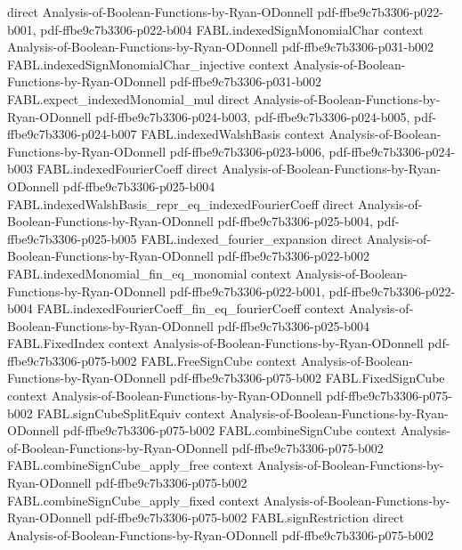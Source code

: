 \begin{theorem}
  {direct}
  {Analysis-of-Boolean-Functions-by-Ryan-ODonnell}
  {pdf-ffbe9c7b3306-p022-b001,
    pdf-ffbe9c7b3306-p022-b004}
\proofstep
  {FABL.indexedSignMonomialChar}
  {context}
  {Analysis-of-Boolean-Functions-by-Ryan-ODonnell}
  {pdf-ffbe9c7b3306-p031-b002}
\proofstep
  {FABL.indexedSignMonomialChar_injective}
  {context}
  {Analysis-of-Boolean-Functions-by-Ryan-ODonnell}
  {pdf-ffbe9c7b3306-p031-b002}
\proofstep
  {FABL.expect_indexedMonomial_mul}
  {direct}
  {Analysis-of-Boolean-Functions-by-Ryan-ODonnell}
  {pdf-ffbe9c7b3306-p024-b003,
    pdf-ffbe9c7b3306-p024-b005,
    pdf-ffbe9c7b3306-p024-b007}
\proofstep
  {FABL.indexedWalshBasis}
  {context}
  {Analysis-of-Boolean-Functions-by-Ryan-ODonnell}
  {pdf-ffbe9c7b3306-p023-b006,
    pdf-ffbe9c7b3306-p024-b003}
\proofstep
  {FABL.indexedFourierCoeff}
  {direct}
  {Analysis-of-Boolean-Functions-by-Ryan-ODonnell}
  {pdf-ffbe9c7b3306-p025-b004}
\proofstep
  {FABL.indexedWalshBasis_repr_eq_indexedFourierCoeff}
  {direct}
  {Analysis-of-Boolean-Functions-by-Ryan-ODonnell}
  {pdf-ffbe9c7b3306-p025-b004,
    pdf-ffbe9c7b3306-p025-b005}
\proofstep
  {FABL.indexed_fourier_expansion}
  {direct}
  {Analysis-of-Boolean-Functions-by-Ryan-ODonnell}
  {pdf-ffbe9c7b3306-p022-b002}
\proofstep
  {FABL.indexedMonomial_fin_eq_monomial}
  {context}
  {Analysis-of-Boolean-Functions-by-Ryan-ODonnell}
  {pdf-ffbe9c7b3306-p022-b001,
    pdf-ffbe9c7b3306-p022-b004}
\proofstep
  {FABL.indexedFourierCoeff_fin_eq_fourierCoeff}
  {context}
  {Analysis-of-Boolean-Functions-by-Ryan-ODonnell}
  {pdf-ffbe9c7b3306-p025-b004}
\proofstep
  {FABL.FixedIndex}
  {context}
  {Analysis-of-Boolean-Functions-by-Ryan-ODonnell}
  {pdf-ffbe9c7b3306-p075-b002}
\proofstep
  {FABL.FreeSignCube}
  {context}
  {Analysis-of-Boolean-Functions-by-Ryan-ODonnell}
  {pdf-ffbe9c7b3306-p075-b002}
\proofstep
  {FABL.FixedSignCube}
  {context}
  {Analysis-of-Boolean-Functions-by-Ryan-ODonnell}
  {pdf-ffbe9c7b3306-p075-b002}
\proofstep
  {FABL.signCubeSplitEquiv}
  {context}
  {Analysis-of-Boolean-Functions-by-Ryan-ODonnell}
  {pdf-ffbe9c7b3306-p075-b002}
\proofstep
  {FABL.combineSignCube}
  {context}
  {Analysis-of-Boolean-Functions-by-Ryan-ODonnell}
  {pdf-ffbe9c7b3306-p075-b002}
\proofstep
  {FABL.combineSignCube_apply_free}
  {context}
  {Analysis-of-Boolean-Functions-by-Ryan-ODonnell}
  {pdf-ffbe9c7b3306-p075-b002}
\proofstep
  {FABL.combineSignCube_apply_fixed}
  {context}
  {Analysis-of-Boolean-Functions-by-Ryan-ODonnell}
  {pdf-ffbe9c7b3306-p075-b002}
\proofstep
  {FABL.signRestriction}
  {direct}
  {Analysis-of-Boolean-Functions-by-Ryan-ODonnell}
  {pdf-ffbe9c7b3306-p075-b002}

\end{theorem}
